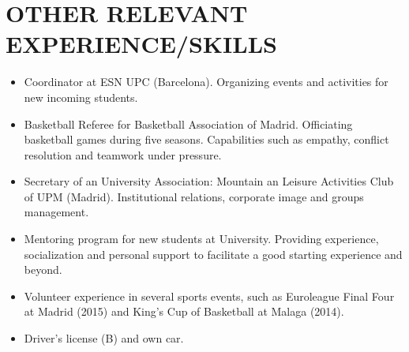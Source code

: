 \documentclass[10pt,a4paper,oneside]{book}
\newcommand{\NewPart}[2]{\section*{\uppercase{#1} #2}}
\begin{document}
\NewPart{Other Relevant Experience/Skills}{}
\begin{itemize}
\item Coordinator at ESN UPC (Barcelona). Organizing events and activities for new incoming students.
\item Basketball Referee for Basketball Association of Madrid. Officiating basketball games during five seasons. Capabilities such as empathy, conflict resolution and teamwork under pressure.
\item Secretary of an University Association: Mountain an Leisure Activities Club of UPM (Madrid). Institutional relations, corporate image and groups management.
\item Mentoring program for new students at University. Providing experience, socialization and personal support to facilitate a good starting experience and beyond.
\item Volunteer experience in several sports events, such as Euroleague Final Four at Madrid (2015) and King’s Cup of Basketball at Malaga (2014).
\item Driver's license (B) and own car.
\end{itemize}
\end{document}
